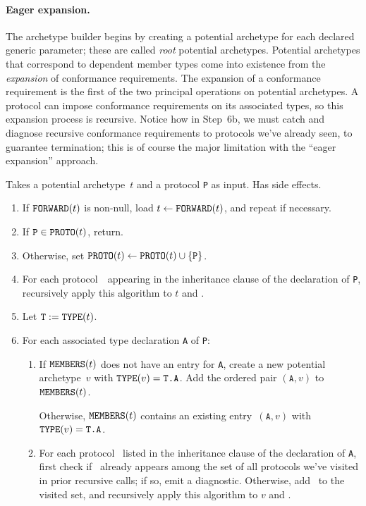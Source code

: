 \documentclass[../generics]{subfiles}
\begin{document}
\paragraph{Eager expansion.}
The archetype builder begins by creating a potential archetype for each declared generic parameter; these are called \emph{root} potential archetypes. Potential archetypes that correspond to dependent member types come into existence from the \emph{expansion} of conformance requirements. The expansion of a conformance requirement is the first of the two principal operations on potential archetypes. A protocol can impose conformance requirements on its associated types, so this expansion process is recursive. Notice how in Step~6b, we must catch and diagnose recursive conformance requirements to protocols we've already seen, to guarantee termination; this is of course the major limitation with the ``eager expansion'' approach.

\begin{algorithm}\label{archetype builder expand}
Takes a potential archetype~$t$ and a protocol \texttt{P} as input. Has side effects.
\begin{enumerate}
\item If $\texttt{FORWARD}(t)$ is non-null, load $t\leftarrow\texttt{FORWARD}(t)$, and repeat if necessary.
\item If $\texttt{P}\in\texttt{PROTO}(t)$, return.
\item Otherwise, set $\texttt{PROTO}(t)\leftarrow \texttt{PROTO}(t)\cup\{\texttt{P}\}$.
\item For each protocol~\tQ\ appearing in the inheritance clause of the declaration of \texttt{P}, recursively apply this algorithm to $t$ and \tQ.
\item Let $\texttt{T}:=\texttt{TYPE}(t)$.
\item For each associated type declaration \texttt{A} of \texttt{P}:
\begin{enumerate}
\item If $\texttt{MEMBERS}(t)$ does not have an entry for \texttt{A}, create a new potential archetype~$v$ with $\texttt{TYPE}(v)=\texttt{T.A}$. Add the ordered pair $(\texttt{A}, v)$ to $\texttt{MEMBERS}(t)$.

Otherwise, $\texttt{MEMBERS}(t)$ contains an existing entry~$(\texttt{A}, v)$ with $\texttt{TYPE}(v)=\texttt{T.A}$.
\item For each protocol \tQ\ listed in the inheritance clause of the declaration of \texttt{A}, first check if \tQ\ already appears among the set of all protocols we've visited in prior recursive calls; if so, emit a diagnostic. Otherwise, add \tQ\ to the visited set, and recursively apply this algorithm to $v$ and \tQ.
\end{enumerate}
\end{enumerate}
\end{algorithm}
\end{document}
